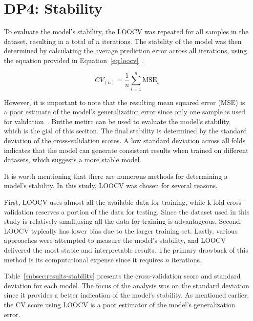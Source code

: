 \section{DP4: Stability}\label{sec:stability}

To evaluate the model's stability, the \ac{LOOCV} was repeated for all samples in the dataset, resulting in a total
of $n$ iterations.
The stability of the model was then determined by calculating the average prediction error across all iterations,
using the equation provided in Equation~\ref{eq:loocv}~\cite[p. 201]{gareth2013introduction}.

\begin{tcolorbox}[arc=0pt,boxrule=0.5pt]
    \begin{equation}
        CV_{(n)} = \frac{1}{n} \sum_{i=1}^{n} \text{MSE}_{i}\label{eq:loocv}
    \end{equation}
\end{tcolorbox}

However, it is important to note that the resulting mean squared error (\ac{MSE}) is a poor estimate of the model's
generalization error since only one sample is used for validation~\cite[p. 201]{gareth2013introduction}.
Butthe metirc can be used to evaluate the model's stability, which is the gial of this seciton.
The final stability is determined by the standard deviation of the cross-validation scores.
A low standard deviation across all folds indicates that the model can generate consistent results when trained on
different datasets, which suggests a more stable model.


It is worth mentioning that there are numerous methods for determining a model's stability.
In this study, \ac{LOOCV} was chosen for several reasons.

First, \ac{LOOCV} uses almost all the available data for training, while k-fold cross -validation reserves a portion
of the data for testing.
Since the dataset used in this study is relatively small,using all the data for training is advantageous.
Second, \ac{LOOCV} typically has lower bias due to the larger training set.
Lastly, various approaches were attempted to measure the model's stability, and \ac{LOOCV} delivered
the most stable and interpretable results.
The primary drawback of this method is its computational expense since it
requires $n$ iterations.

Table~\ref{subsec:results-stability} presents the cross-validation score and standard deviation for each model. The
focus of the analysis was on the standard deviation since it provides a better indication of the model's stability.
As mentioned earlier, the \ac{CV} score using \ac{LOOCV} is a poor estimator of the model's generalization error.

